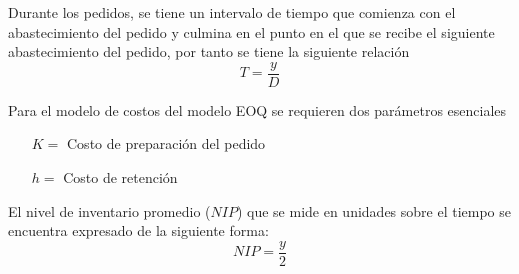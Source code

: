 Durante los pedidos, se tiene un intervalo de tiempo que comienza con el abastecimiento del pedido y culmina en el punto en el que se recibe el siguiente abastecimiento del pedido, por tanto se tiene la siguiente relación
\begin{equation}
	\label{T}
	T = \frac{y}{D}
\end{equation}

Para el modelo de costos del modelo EOQ se requieren dos parámetros esenciales
\begin{itemize}
	\item[$K=$] Costo de preparación del pedido
	\item[$h=$] Costo de retención
\end{itemize}

El nivel de inventario promedio ($NIP$) que se mide en unidades sobre el tiempo se encuentra expresado de la siguiente forma:
\begin{equation}
	\label{NIP}
	NIP=\frac{y}{2}
\end{equation}

